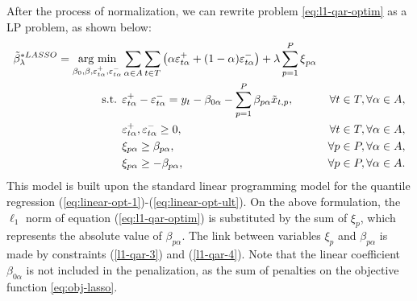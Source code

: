 After the process of normalization, we can rewrite problem \ref{eq:l1-qar-optim} as a LP problem, as shown below:
\begin{eqnarray}
\tilde \beta_\lambda^{*LASSO} = \underset{\beta_{0},\beta,\varepsilon_{t \alpha}^{+},\varepsilon_{t \alpha}^{-}}{\text{arg min}} & \sum_{\alpha \in A} \sum_{t \in T}\left(\alpha\varepsilon_{t \alpha}^{+}+(1-\alpha)\varepsilon_{t \alpha}^{-}\right)+\lambda\sum_{p=1}^{P}\mbox{\ensuremath{\xi}}_{p \alpha} \label{eq:obj-lasso} \\
\mbox{s.t. } & \varepsilon_{t \alpha}^{+}-\varepsilon_{t \alpha}^{-}= y_{t}-\beta_{0 \alpha}-\sum_{p=1}^{P}\beta_{p \alpha}\tilde x_{t,p},&\forall t\in T, \forall \alpha \in A, \\
& \varepsilon_{t \alpha}^{+},\varepsilon_{t \alpha}^{-}\geq0,&\forall t \in T, \forall \alpha \in A,\\
& \xi_{p\alpha}\geq\beta_{p \alpha},&\forall p\in P, \forall \alpha \in A,  \label{l1-qar-3}
\\
& \xi_{p\alpha}\geq-\beta_{p \alpha},&\forall p\in P, \forall \alpha \in A.  \label{l1-qar-4}
\end{eqnarray}
This model is built upon the standard linear programming model for the quantile regression (\ref{eq:linear-opt-1})-(\ref{eq:linear-opt-ult}). 
On the above formulation, the $\ell_1$ norm of equation (\ref{eq:l1-qar-optim}) is substituted by the sum of $\xi_p$, which represents the absolute value of $\beta_{p\alpha}$. The link between variables $\xi_p$ and $\beta_{p\alpha}$ is made by constraints (\ref{l1-qar-3}) and (\ref{l1-qar-4}). Note that the linear coefficient $\beta_{0\alpha}$ is not included in the penalization, as the sum of penalties on the objective function \ref{eq:obj-lasso}.




